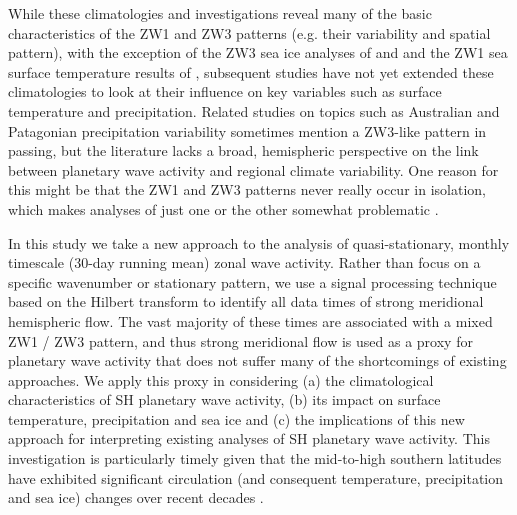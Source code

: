 While these climatologies and investigations reveal many of the basic characteristics of the ZW1 and ZW3 patterns (e.g. their variability and spatial pattern), with the exception of the ZW3 sea ice analyses of \citet{Raphael2007} and \citet{Yuan2008} and the ZW1 sea surface temperature results of \citet{Hobbs2007}, subsequent studies have not yet extended these climatologies to look at their influence on key variables such as surface temperature and precipitation. Related studies on topics such as Australian \citep{Frederiksen2014} and Patagonian \citep{Garreaud2013} precipitation variability sometimes mention a ZW3-like pattern in passing, but the literature lacks a broad, hemispheric perspective on the link between planetary wave activity and regional climate variability. One reason for this might be that the ZW1 and ZW3 patterns never really occur in isolation, which makes analyses of just one or the other somewhat problematic \citep{Hobbs2010}.

In this study we take a new approach to the analysis of quasi-stationary, monthly timescale (30-day running mean) zonal wave activity. Rather than focus on a specific wavenumber or stationary pattern, we use a signal processing technique based on the Hilbert transform to identify all data times of strong meridional hemispheric flow. The vast majority of these times are associated with a mixed ZW1 / ZW3 pattern, and thus strong meridional flow is used as a proxy for planetary wave activity that does not suffer many of the shortcomings of existing approaches. We apply this proxy in considering (a) the climatological characteristics of SH planetary wave activity, (b) its impact on surface temperature, precipitation and sea ice and (c) the implications of this new approach for interpreting existing analyses of SH planetary wave activity. This investigation is particularly timely given that the mid-to-high southern latitudes have exhibited significant circulation (and consequent temperature, precipitation and sea ice) changes over recent decades \citep[e.g.][]{Bromwich2013,Burgener2013,Simmonds2015}. 

  